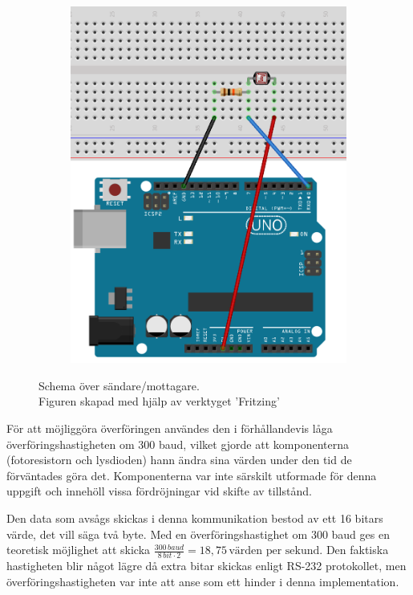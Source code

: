 \begin{figure}
\begin{subfigure}[b]{0.35\textwidth}
                    \includegraphics[width=\textwidth]{res/img/resistor}    
                \end{subfigure}
            \caption[Schema över sändare/mottagare]{Schema över sändare/mottagare. \\\tiny{Figuren skapad med hjälp av verktyget 'Fritzing'}}\label{fig:schema}
            \end{figure}

            För att möjliggöra överföringen användes den i förhållandevis låga överföringshastigheten om 300 baud, vilket gjorde att komponenterna (fotoresistorn och lysdioden) hann ändra sina värden under den tid de förväntades göra det. Komponenterna var inte särskilt utformade för denna uppgift och innehöll vissa fördröjningar vid skifte av tillstånd. \bigskip

            Den data som avsågs skickas i denna kommunikation bestod av ett 16 bitars värde, det vill säga två byte. Med en överföringshastighet om 300 baud ges en teoretisk möjlighet att skicka $\frac{300 \,\textit{baud}}{8 \, bit \cdot 2} = 18,75 \, \text{värden per sekund}$. Den faktiska hastigheten blir något lägre då extra bitar skickas enligt RS-232 protokollet, men överföringshastigheten var inte att anse som ett hinder i denna implementation. \bigskip
            
